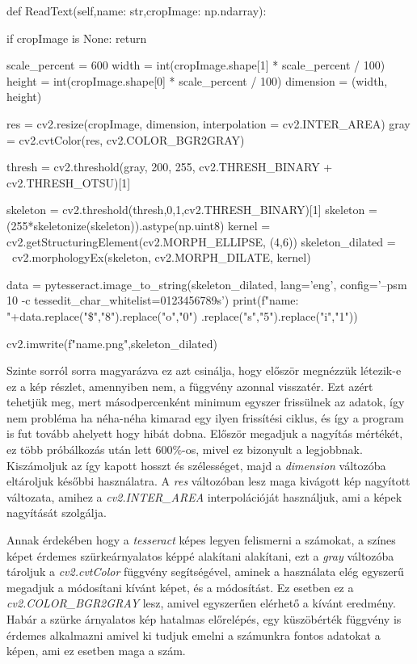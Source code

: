 \begin{python}
def ReadText(self,name: str,cropImage: np.ndarray):

    if cropImage is None:
        return

    scale_percent = 600 
    width = int(cropImage.shape[1] * scale_percent / 100)
    height = int(cropImage.shape[0] * scale_percent / 100)
    dimension = (width, height)


    res = cv2.resize(cropImage, dimension, 
                    interpolation = cv2.INTER_AREA)
    gray = cv2.cvtColor(res, cv2.COLOR_BGR2GRAY)

    thresh = cv2.threshold(gray, 200, 255, 
                        cv2.THRESH_BINARY + cv2.THRESH_OTSU)[1]

    skeleton = cv2.threshold(thresh,0,1,cv2.THRESH_BINARY)[1]
    skeleton = (255*skeletonize(skeleton)).astype(np.uint8)
    kernel = cv2.getStructuringElement(cv2.MORPH_ELLIPSE, (4,6)) 
    skeleton_dilated = ~cv2.morphologyEx(skeleton, 
                            cv2.MORPH_DILATE, kernel)

    data = pytesseract.image_to_string(skeleton_dilated, 
    lang='eng', config='--psm 10 -c tessedit_char_whitelist=0123456789s')
    print(f"{name}: "+data.replace("\$","8").replace("o","0")
                    .replace("s","5").replace("i","1"))

    cv2.imwrite(f"{name}.png",skeleton_dilated)
\end{python}

Szinte sorról sorra magyarázva ez azt csinálja, hogy először megnézzük létezik-e ez a kép részlet, amennyiben nem, a függvény azonnal visszatér. Ezt azért tehetjük meg, mert másodpercenként minimum egyszer frissülnek az adatok, így nem probléma ha néha-néha kimarad egy ilyen frissítési ciklus, és így a program is fut tovább ahelyett hogy hibát dobna.
Először megadjuk a nagyítás mértékét, ez több próbálkozás után lett 600\%-os, mivel ez bizonyult a legjobbnak. Kiszámoljuk az így kapott hosszt és szélességet, majd a \textit{dimension} változóba eltároljuk későbbi használatra. 
A \textit{res} változóban lesz maga kivágott kép nagyított változata, amihez a \textit{cv2.INTER\_AREA} interpolációját használjuk, ami a képek nagyítását szolgálja.

Annak érdekében hogy a \textit{tesseract} képes legyen felismerni a számokat, a színes képet érdemes szürkeárnyalatos képpé alakítani alakítani, ezt a \textit{gray} változóba tároljuk a \textit{cv2.cvtColor} függvény segítségével, aminek a használata elég egyszerű
megadjuk a módosítani kívánt képet, és a módosítást. Ez esetben ez a \textit{cv2.COLOR\_BGR2GRAY} lesz, amivel egyszerűen elérhető a kívánt eredmény.
Habár a szürke árnyalatos kép hatalmas előrelépés, egy küszöbérték függvény is érdemes alkalmazni amivel ki tudjuk emelni a számunkra fontos adatokat a képen, ami ez esetben maga a szám.


